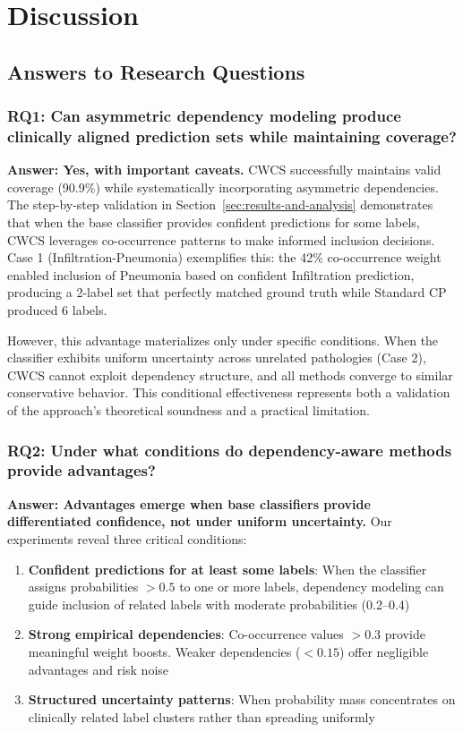 \section{Discussion}
\label{sec:discussion}

\subsection{Answers to Research Questions}

\subsubsection{RQ1: Can asymmetric dependency modeling produce clinically aligned prediction sets while maintaining coverage?}

\textbf{Answer: Yes, with important caveats.} CWCS successfully maintains valid coverage (90.9\%) while systematically incorporating asymmetric dependencies. The step-by-step validation in Section~\ref{sec:results-and-analysis} demonstrates that when the base classifier provides confident predictions for some labels, CWCS leverages co-occurrence patterns to make informed inclusion decisions. Case 1 (Infiltration-Pneumonia) exemplifies this: the 42\% co-occurrence weight enabled inclusion of Pneumonia based on confident Infiltration prediction, producing a 2-label set that perfectly matched ground truth while Standard CP produced 6 labels.

However, this advantage materializes only under specific conditions. When the classifier exhibits uniform uncertainty across unrelated pathologies (Case 2), CWCS cannot exploit dependency structure, and all methods converge to similar conservative behavior. This conditional effectiveness represents both a validation of the approach's theoretical soundness and a practical limitation.

\subsubsection{RQ2: Under what conditions do dependency-aware methods provide advantages?}

\textbf{Answer: Advantages emerge when base classifiers provide differentiated confidence, not under uniform uncertainty.} Our experiments reveal three critical conditions:

\begin{enumerate}
    \item \textbf{Confident predictions for at least some labels}: When the classifier assigns probabilities $>0.5$ to one or more labels, dependency modeling can guide inclusion of related labels with moderate probabilities (0.2--0.4)
    
    \item \textbf{Strong empirical dependencies}: Co-occurrence values $>0.3$ provide meaningful weight boosts. Weaker dependencies ($<0.15$) offer negligible advantages and risk noise
    
    \item \textbf{Structured uncertainty patterns}: When probability mass concentrates on clinically related label clusters rather than spreading uniformly
\end{enumerate}

